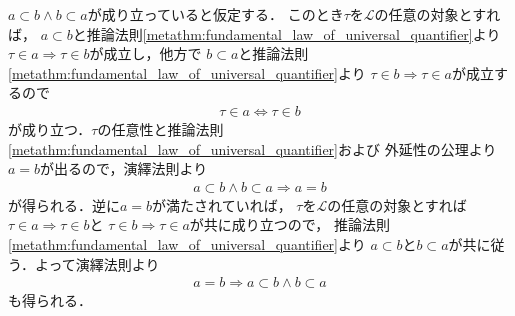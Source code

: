 	\begin{prf}
		$a \subset b \wedge b \subset a$が成り立っていると仮定する．
		このとき$\tau$を$\mathcal{L}$の任意の対象とすれば，
		$a \subset b$と推論法則\ref{metathm:fundamental_law_of_universal_quantifier}より
		$\tau \in a \Longrightarrow \tau \in b$が成立し，他方で
		$b \subset a$と推論法則\ref{metathm:fundamental_law_of_universal_quantifier}より
		$\tau \in b \Longrightarrow \tau \in a$が成立するので
		\begin{align}
			\tau \in a \Longleftrightarrow \tau \in b
		\end{align}
		が成り立つ．$\tau$の任意性と推論法則\ref{metathm:fundamental_law_of_universal_quantifier}および
		外延性の公理より$a = b$が出るので，演繹法則より
		\begin{align}
			a \subset b \wedge b \subset a \Longrightarrow a = b
		\end{align}
		が得られる．逆に$a = b$が満たされていれば，
		$\tau$を$\mathcal{L}$の任意の対象とすれば$\tau \in a \Longrightarrow \tau \in b$と
		$\tau \in b \Longrightarrow \tau \in a$が共に成り立つので，
		推論法則\ref{metathm:fundamental_law_of_universal_quantifier}より
		$a \subset b$と$b \subset a$が共に従う．よって演繹法則より
		\begin{align}
			a = b \Longrightarrow a \subset b \wedge b \subset a
		\end{align}
		も得られる．
		\QED
	\end{prf}
	
